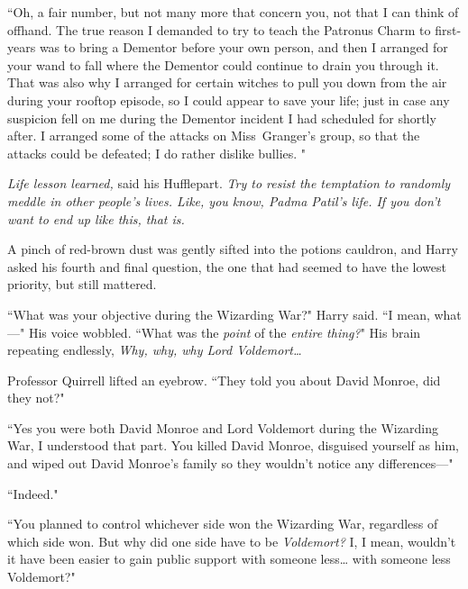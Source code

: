 ``Oh, a fair number, but not many more that concern you, not that I can think of offhand. The true reason I demanded to try to teach the Patronus Charm to first-years was to bring a Dementor before your own person, and then I arranged for your wand to fall where the Dementor could continue to drain you through it.  That was also why I arranged for certain witches to pull you down from the air during your rooftop episode, so I could appear to save your life; just in case any suspicion fell on me during the Dementor incident I had scheduled for shortly after.  I arranged some of the attacks on Miss~Granger's group, so that the attacks could be defeated; I do rather dislike bullies. "

\emph{Life lesson learned,} said his Hufflepart. \emph{Try to resist the temptation to randomly meddle in other people's lives. Like, you know, Padma Patil's life. If you don't want to end up like this, that is.}

A pinch of red-brown dust was gently sifted into the potions cauldron, and Harry asked his fourth and final question, the one that had seemed to have the lowest priority, but still mattered.

``What was your objective during the Wizarding War?" Harry said. ``I mean, what—" His voice wobbled. ``What was the \emph{point} of the \emph{entire thing?}" His brain repeating endlessly, \emph{Why, why, why Lord Voldemort{\ldots}}

Professor Quirrell lifted an eyebrow. ``They told you about David Monroe, did they not?"

``Yes you were both David Monroe and Lord Voldemort during the Wizarding War, I understood that part. You killed David Monroe, disguised yourself as him, and wiped out David Monroe's family so they wouldn't notice any differences—"

``Indeed."

``You planned to control whichever side won the Wizarding War, regardless of which side won. But why did one side have to be \emph{Voldemort?} I, I mean, wouldn't it have been easier to gain public support with someone less{\ldots} with someone less Voldemort?"

